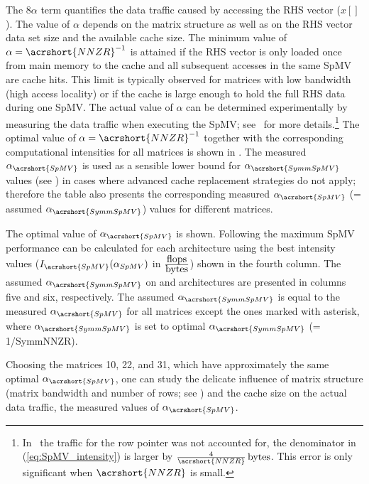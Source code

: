 The $8\alpha$ term quantifies the data traffic caused by accessing the
RHS vector ($x[]$). The value of $\alpha$ depends on
the matrix structure as well as on the RHS vector data set size and
the available cache size. The minimum value of
$\alpha=\acrshort{NNZR}^{-1}$ is attained if the RHS vector is only
loaded once from main memory to the cache and all subsequent accesses
in the same \acrshort{SpMV} are cache hits. This limit is typically
observed for matrices with low bandwidth (high access locality) or if
the cache is large enough to hold the full RHS data during
one \acrshort{SpMV}. The actual value of $\alpha$ can be determined
experimentally by measuring the data traffic when executing
the \acrshort{SpMV}; see~\cite{Moritz_sell} for more
details.\footnote{In~\cite{Moritz_sell} the traffic for the row
pointer was not accounted for, \ie the denominator in
(\ref{eq:SpMV_intensity}) is larger by
$\frac{4}{\acrshort{NNZR}}\,\BYTE$. This error is only significant
when $\acrshort{NNZR}$ is small.}  The optimal value of
$\alpha=\acrshort{NNZR}^{-1}$ together with the corresponding
computational intensities for all matrices is shown in 
. The measured $\alpha_{\acrshort{SpMV}}$
 is used as a sensible lower bound for $\alpha_{\acrshort{SymmSpMV}}$ 
 values (see ) in cases where advanced cache
 replacement strategies  do not apply; therefore the table also presents the 
 corresponding measured $\alpha_{\acrshort{SpMV}}$ (= assumed $\alpha_{\acrshort{SymmSpMV}}$)
values for different matrices.
\begin{table}[t]
	\centering
	\caption{The optimal value of $\alpha_{\acrshort{SpMV}}$ is shown. 
	Following  the
	maximum \acrshort{SpMV} performance can be calculated for each
	architecture using the best intensity values
	($I_{\acrshort{SpMV}}(\alpha_{SpMV})$ in
	$\frac{\mbox{flops}}{\mbox{bytes}}$) shown in the fourth
	column. The assumed $\alpha_{\acrshort{SymmSpMV}}$ on \SKX and 
	\IVB architectures are presented in columns five and six, respectively.
	The assumed $\alpha_{\acrshort{SymmSpMV}}$ is equal to 
	the measured $\alpha_{\acrshort{SpMV}}$ for all matrices
	except the ones marked with asterisk, where  $\alpha_{\acrshort{SymmSpMV}}$
	is set to optimal $\alpha_{\acrshort{SymmSpMV}}$ (= 1/\acrshort{SymmNNZR}).
	 \label{table:alpha_values}}
    \begin{center} 
      
    \end{center}
\end{table}
Choosing the matrices 10, 22, and 31, which have approximately the
same optimal $\alpha_{\acrshort{SpMV}}$, one can study the delicate
influence of matrix structure (\ie matrix bandwidth and number of
rows; see ) and the cache size on the actual data
traffic, \ie the measured values of $\alpha_{\acrshort{SpMV}}$.
 
